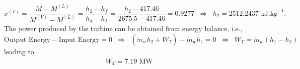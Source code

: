 \documentclass[calculator,allquestions,datasheet,mock]{exam_newMarcus2}
\newcommand{\frc}{\displaystyle\frac}
\newcommand{\mfr}[3][error]{#1_{#2}^{\left(#3\right)}}
\begin{document}
\begin{question}
\begin{enumerate}[(a)]
\begin{enumerate}
{                       \begin{displaymath}
                          \mfr[x]{}{V} = \frc{M-\mfr[M]{}{L}}{\mfr[M]{}{V} - \mfr[M]{}{L}} = \frc{h_{2}-h_{f}}{h_{g}-h_{f}} = \frc{h_{2}-417.46}{2675.5-417.46} = 0.9277\;\;\Rightarrow\;\; h_{2} = 2512.2437\text{ kJ.kg}^{-1}.
                       \end{displaymath}
                       The power produced by the turbine can be obtained from energy balance, i.e.,
                        \begin{displaymath}
                            \text{Output Energy} - \text{Input Energy} = 0 \;\;\Rightarrow\;\; \left(\dot{m}_{w}h_{2}+\dot{W}_{T}\right) - \dot{m}_{w}h_{1} = 0\;\;\Leftrightarrow\;\; \dot{W}_{T} = \dot{m}_{w}\left(h_{1}-h_{2}\right)
                        \end{displaymath}
                        leading to~
                        \begin{displaymath}
                           \dot{W}_{T} = 7.19\text{ MW}
                        \end{displaymath}
                  }
          \end{enumerate}
                         
\end{enumerate}

\end{question}


\vfill
\paperend



\vfill 



{
  
  
}
\end{document}
